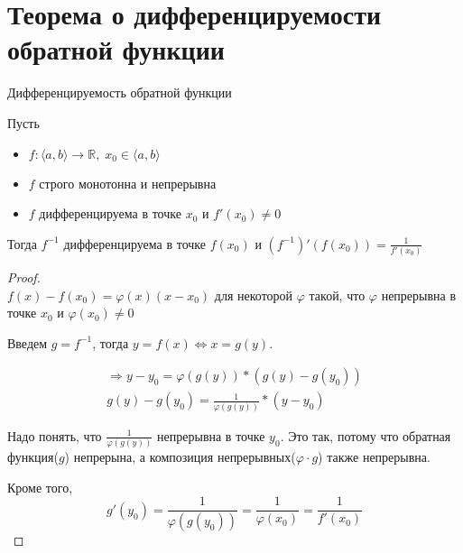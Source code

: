 \section{Теорема о дифференцируемости обратной функции}
\begin{theorem-non}
    Дифференцируемость обратной функции

    Пусть
    \begin{itemize}
        \item $f: \langle a, b \rangle \to \mathbb{R}, \; x_0 \in \langle a, b \rangle$
        \item $f$ строго монотонна и непрерывна
        \item $f$ дифференцируема в точке $x_0$ и $f'(x_0) \neq 0$
    \end{itemize}

    Тогда $f^{-1}$ дифференцируема в точке $f(x_0)$ и $(f^{-1})'(f(x_0)) = \frac{1}{f'(x_0)}$
\end{theorem-non}
\begin{proof} \quad \\
    $f(x) - f(x_0) = \varphi(x)(x - x_0)$ для некоторой $\varphi$ такой, что $\varphi$ непрерывна в точке $x_0$ и $\varphi(x_0) \neq 0$

    Введем $g = f^{-1}$, тогда $y = f(x) \Leftrightarrow x = g(y)$.

    \begin{gather*}
        \Rightarrow y - y_0 = \varphi(g(y)) * (g(y) - g(y_0)) \\
        g(y) - g(y_0) = \frac{1}{\varphi(g(y))} * (y - y_0)
    \end{gather*}

    Надо понять, что $\frac{1}{\varphi(g(y))}$ непрерывна в точке $y_0$. Это так, потому что обратная функция($g$) непрерына, а композиция непрерывных($\varphi \cdot g$) также непрерывна.

    Кроме того,
    \[ g'(y_0) = \frac{1}{\varphi(g(y_0))} = \frac{1}{\varphi(x_0)} = \frac{1}{f'(x_0)} \]
\end{proof}